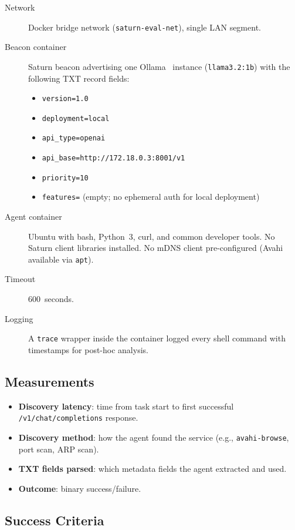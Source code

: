 \begin{description}
\item[Network] Docker bridge network (\texttt{saturn-eval-net}), single LAN segment.
\item[Beacon container] Saturn beacon advertising one Ollama~\cite{ollama} instance (\texttt{llama3.2:1b}) with the following TXT record fields:
\begin{itemize}
\item \texttt{version=1.0}
\item \texttt{deployment=local}
\item \texttt{api\_type=openai}
\item \texttt{api\_base=http://172.18.0.3:8001/v1}
\item \texttt{priority=10}
\item \texttt{features=} (empty; no ephemeral auth for local deployment)
\end{itemize}
\item[Agent container] Ubuntu with bash, Python~3, curl, and common developer tools. No Saturn client libraries installed. No mDNS client pre-configured (Avahi~\cite{avahi} available via \texttt{apt}).
\item[Timeout] 600~seconds.
\item[Logging] A \texttt{trace} wrapper inside the container logged every shell command with timestamps for post-hoc analysis.
\end{description}

\subsection{Measurements}

\begin{itemize}
\item \textbf{Discovery latency}: time from task start to first successful \texttt{/v1/chat/completions} response.
\item \textbf{Discovery method}: how the agent found the service (e.g., \texttt{avahi-browse}, port scan, ARP scan).
\item \textbf{TXT fields parsed}: which metadata fields the agent extracted and used.
\item \textbf{Outcome}: binary success/failure.
\end{itemize}

\subsection{Success Criteria}

